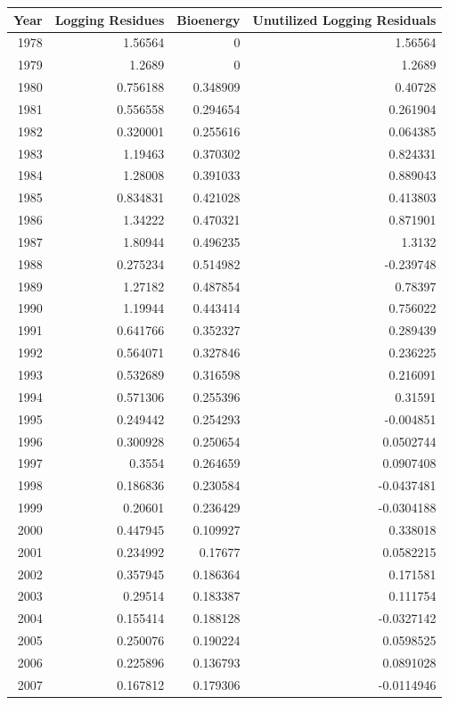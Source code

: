 \documentclass[a4paper]{article}
\begin{document}
\begin{table}[htb]
\centering
\begin{tabular}{rrrr}
Year & Logging Residues & Bioenergy & Unutilized Logging Residuals\\
\hline
1978 & 1.56564 & 0 & 1.56564\\
1979 & 1.2689 & 0 & 1.2689\\
1980 & 0.756188 & 0.348909 & 0.40728\\
1981 & 0.556558 & 0.294654 & 0.261904\\
1982 & 0.320001 & 0.255616 & 0.064385\\
1983 & 1.19463 & 0.370302 & 0.824331\\
1984 & 1.28008 & 0.391033 & 0.889043\\
1985 & 0.834831 & 0.421028 & 0.413803\\
1986 & 1.34222 & 0.470321 & 0.871901\\
1987 & 1.80944 & 0.496235 & 1.3132\\
1988 & 0.275234 & 0.514982 & -0.239748\\
1989 & 1.27182 & 0.487854 & 0.78397\\
1990 & 1.19944 & 0.443414 & 0.756022\\
1991 & 0.641766 & 0.352327 & 0.289439\\
1992 & 0.564071 & 0.327846 & 0.236225\\
1993 & 0.532689 & 0.316598 & 0.216091\\
1994 & 0.571306 & 0.255396 & 0.31591\\
1995 & 0.249442 & 0.254293 & -0.004851\\
1996 & 0.300928 & 0.250654 & 0.0502744\\
1997 & 0.3554 & 0.264659 & 0.0907408\\
1998 & 0.186836 & 0.230584 & -0.0437481\\
1999 & 0.20601 & 0.236429 & -0.0304188\\
2000 & 0.447945 & 0.109927 & 0.338018\\
2001 & 0.234992 & 0.17677 & 0.0582215\\
2002 & 0.357945 & 0.186364 & 0.171581\\
2003 & 0.29514 & 0.183387 & 0.111754\\
2004 & 0.155414 & 0.188128 & -0.0327142\\
2005 & 0.250076 & 0.190224 & 0.0598525\\
2006 & 0.225896 & 0.136793 & 0.0891028\\
2007 & 0.167812 & 0.179306 & -0.0114946\\

\end{tabular}
\end{table}
\end{document}
